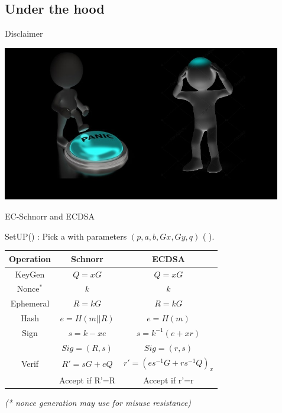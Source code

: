\documentclass[aspectratio=43]{beamer}
\begin{document}
 \subsection{Under the hood}

\begin{frame}{Disclaimer}

 \begin{center}
 \includegraphics[width=12.2cm]{images/panic.jpg}
 \end{center}


\end{frame}
 

\begin{frame}{EC-Schnorr and ECDSA}

SetUP() : Pick a \href{https://github.com/LedgerHQ/speculos/blob/master/src/bolos/cx_ec_domain.c}{} with parameters $(p,a,b,Gx,Gy,q)$ (\href{https://hyperelliptic.org/EFD/g1p/auto-shortw.html}{} ).

  \begin{center}
\begin{tabular}{|c|c |c|}
\hline
Operation&Schnorr & ECDSA \\
\hline
KeyGen &$Q=xG$        &$Q=xG$ \\

Nonce$^*$&$k$	&  $k$ \\
Ephemeral&$R=kG$    &$R=kG$  \\
\hline

Hash &$e=H(m||R)$ & $e=H(m)$\\
\hline

Sign &$s=k-xe$    & $s=k^{-1}(e+xr)$  \\
     & $Sig=(R,s)$ & $Sig=(r,s)$ \\	
\hline
Verif &   $R'=sG+eQ$& $r'=(es^{-1}G+rs^{-1}Q)_x $ \\    
      & Accept if R'=R & Accept if r'=r \\
\hline
\end{tabular}  
 \end{center}
 
 
 \begin{center}
 \begin{small}
 {\emph{
 (* nonce generation may use \href{https://www.rfc-editor.org/rfc/rfc6979}{} for misuse resistance)}}
 \end{small}
\end{center}

\end{frame} 
 
\end{document}
